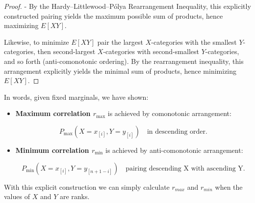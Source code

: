\documentclass[
  12pt,
]{article}
\begin{document}
\begin{proof}
- By the Hardy–Littlewood–Pólya Rearrangement Inequality, this explicitly constructed pairing yields the maximum possible sum of products, hence maximizing $E[XY]$.
    

Likewise, to minimize $E[XY]$ pair the largest $X$-categories with the smallest $Y$-categories, then second-largest $X$-categories with second-smallest $Y$-categories, and so forth (anti-comonotonic ordering).   By the rearrangement inequality, this arrangement explicitly yields the minimal sum of products, hence minimizing $E[XY]$.
    


\end{proof}

In words, given fixed marginals, we have shown:

\begin{itemize}
\item
  \textbf{Maximum correlation \(r_{\text{max}}\)} is achieved by
  comonotonic arrangement:

  \[P_{\text{max}}(X=x_{[i]}, Y=y_{[i]}) \quad\text{in descending order.}\]
\item
  \textbf{Minimum correlation \(r_{\text{min}}\)} is achieved by
  anti-comonotonic arrangement:

  \[P_{\text{min}}(X=x_{[i]}, Y=y_{[n+1-i]}) \quad\text{pairing descending X with ascending Y.}\]
\end{itemize}

With this explicit construction we can simply calculate \(r_{max}\) and
\(r_{min}\) when the values of \(X\) and \(Y\) are ranks.
\end{document}
